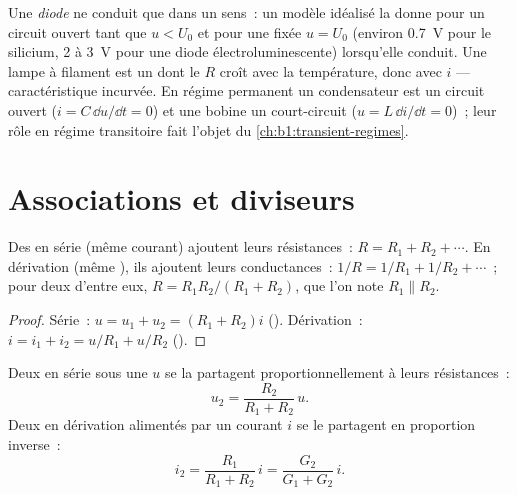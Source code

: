 \begin{remark}\label{rem:b1:dc-circuits:others}
Une \emph{diode} ne conduit que dans un sens~: un modèle idéalisé la
donne pour un circuit ouvert tant que $u < U_0$ et pour une 
fixée $u = U_0$ (environ \qty{0.7}{V} pour le silicium, \qty{2}{} à
\qty{3}{V} pour une diode électroluminescente) lorsqu'elle conduit. Une
lampe à filament est un  dont le $R$ croît avec la
température, donc avec $i$ --- caractéristique incurvée. En régime
permanent un condensateur est un circuit ouvert ($i = C\,\dd u/\dd t = 0$)
et une bobine un court-circuit ($u = L\,\dd i/\dd t = 0$)~; leur rôle en
régime transitoire fait l'objet du \cref{ch:b1:transient-regimes}.
\end{remark}

\section{Associations et diviseurs}

\begin{proposition}\label{prop:b1:dc-circuits:seriesparallel}
Des  en série (même courant) ajoutent leurs
résistances~: $R = R_1 + R_2 + \cdots$. En dérivation (même ),
ils ajoutent leurs conductances~: $1/R = 1/R_1 + 1/R_2 + \cdots$~; pour
deux d'entre eux, $R = R_1R_2/(R_1 + R_2)$, que l'on note
$R_1 \parallel R_2$.
\end{proposition}

\begin{proof}
Série~: $u = u_1 + u_2 = (R_1 + R_2)i$ (). Dérivation~: $i = i_1 +
i_2 = u/R_1 + u/R_2$ ().
\end{proof}

\begin{proposition}\label{prop:b1:dc-circuits:dividers}
Deux  en série sous une  $u$ se la partagent
proportionnellement à leurs résistances~:
\[
u_2 = \frac{R_2}{R_1 + R_2}\,u .
\]
Deux  en dérivation alimentés par un courant $i$ se
le partagent en proportion inverse~:
\[
i_2 = \frac{R_1}{R_1 + R_2}\,i = \frac{G_2}{G_1 + G_2}\,i .
\]
\end{proposition}

